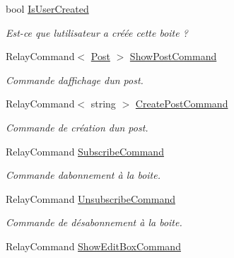 \begin{DoxyCompactItemize}
bool \hyperlink{class_boxes_1_1_view_models_1_1_box_view_model_aa25d0d404a895b9b5db7c74be8c3024e}{Is\+User\+Created}
\begin{DoxyCompactList}\small\item\em Est-\/ce que l\textquotesingle{}utilisateur a créée cette boite ? \end{DoxyCompactList}\item 
Relay\+Command$<$ \hyperlink{class_boxes_1_1_models_1_1_post}{Post} $>$ \hyperlink{class_boxes_1_1_view_models_1_1_box_view_model_a710b5fcbc616b99d09452dbf30410d6a}{Show\+Post\+Command}
\begin{DoxyCompactList}\small\item\em Commande d\textquotesingle{}affichage d\textquotesingle{}un post. \end{DoxyCompactList}\item 
Relay\+Command$<$ string $>$ \hyperlink{class_boxes_1_1_view_models_1_1_box_view_model_a4742d289c4d4c9d0e91cfe43e2be39ed}{Create\+Post\+Command}
\begin{DoxyCompactList}\small\item\em Commande de création d\textquotesingle{}un post. \end{DoxyCompactList}\item 
Relay\+Command \hyperlink{class_boxes_1_1_view_models_1_1_box_view_model_a05a5f49c5193e7ee3733b14938f9405a}{Subscribe\+Command}
\begin{DoxyCompactList}\small\item\em Commande d\textquotesingle{}abonnement à la boite. \end{DoxyCompactList}\item 
Relay\+Command \hyperlink{class_boxes_1_1_view_models_1_1_box_view_model_a461813602082d4e73290f57da2198e75}{Unsubscribe\+Command}
\begin{DoxyCompactList}\small\item\em Commande de désabonnement à la boite. \end{DoxyCompactList}\item 
Relay\+Command \hyperlink{class_boxes_1_1_view_models_1_1_box_view_model_a794084993b6116de56455d6a2f255a61}{Show\+Edit\+Box\+Command}

\end{DoxyCompactItemize}
